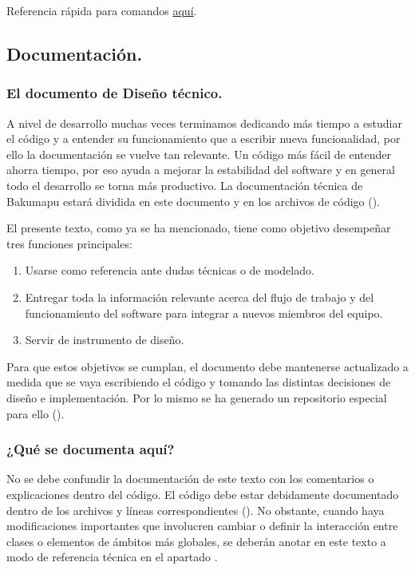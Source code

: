 Referencia rápida para comandos  \href{https://rogerdudler.github.io/git-guide}{aquí}.


\subsection{Documentación.}\label{flujo:documentacion}

\subsubsection{El documento de Diseño técnico.}\label{flujo:documento-de-diseno}
A nivel de desarrollo muchas veces terminamos dedicando más tiempo a estudiar el código y a entender su funcionamiento que a escribir nueva funcionalidad, por ello la documentación se vuelve tan relevante. Un código más fácil de entender ahorra tiempo, por eso ayuda a mejorar la estabilidad del software y en general todo el desarrollo se torna más productivo. La documentación técnica de Bakumapu estará dividida en este documento y en los archivos de código ().

El presente texto, como ya se ha mencionado, tiene como objetivo desempeñar tres funciones principales:
\begin{enumerate}[noitemsep]
	\item Usarse como referencia ante dudas técnicas o de modelado.
	\item Entregar toda la información relevante acerca del flujo de trabajo y del funcionamiento del software para integrar a nuevos miembros del equipo.
	\item Servir de instrumento de diseño.
\end{enumerate}

Para que estos objetivos se cumplan, el documento debe mantenerse actualizado a medida que se vaya escribiendo el código y tomando las distintas decisiones de diseño e implementación. Por lo mismo se ha generado un repositorio especial para ello (). 

\subsubsection*{¿Qué se documenta aquí?}
No se debe confundir la documentación de este texto con los comentarios o explicaciones dentro del código. El código debe estar debidamente documentado dentro de los archivos y líneas correspondientes (). No obstante, cuando haya modificaciones importantes que involucren cambiar o definir la interacción entre clases o elementos de ámbitos más globales, se deberán anotar en este texto a modo de referencia técnica en el apartado .

